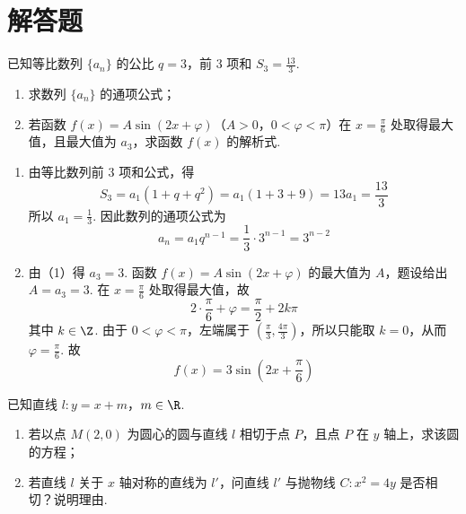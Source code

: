 \section{解答题}

\begin{problem}
已知等比数列 \(\{a_n\}\) 的公比 \(q=3\)，前 \(3\) 项和 \(S_3=\frac{13}{3}\).

\begin{enumerate}
\item 求数列 \(\{a_n\}\) 的通项公式；
\item 若函数 \(f(x)=A\sin\left(2x+\varphi\right)\)（\(A>0\)，\(0<\varphi<\pi\)）在 \(x=\frac{\pi}{6}\) 处取得最大值，且最大值为 \(a_3\)，求函数 \(f(x)\) 的解析式.
\end{enumerate}
\end{problem}

\begin{solution}
\begin{enumerate}
\item 由等比数列前 \(3\) 项和公式，得
\[
S_3=a_1\left(1+q+q^2\right)=a_1(1+3+9)=13a_1=\frac{13}{3}
\]
所以 \(a_1=\frac{1}{3}\). 因此数列的通项公式为
\[
a_n=a_1q^{n-1}=\frac{1}{3}\cdot3^{n-1}=3^{n-2}
\]

\item 由（1）得 \(a_3=3\). 函数 \(f(x)=A\sin(2x+\varphi)\) 的最大值为 \(A\)，题设给出 \(A=a_3=3\). 在 \(x=\frac{\pi}{6}\) 处取得最大值，故
\[
2\cdot\frac{\pi}{6}+\varphi=\frac{\pi}{2}+2k\pi
\]
其中 \(k\in\Z\). 由于 \(0<\varphi<\pi\)，左端属于 \(\left(\frac{\pi}{3},\frac{4\pi}{3}\right)\)，所以只能取 \(k=0\)，从而 \(\varphi=\frac{\pi}{6}\). 故
\[
f(x)=3\sin\left(2x+\frac{\pi}{6}\right)
\]
\end{enumerate}
\end{solution}

\begin{problem}
已知直线 \(l:y=x+m\)，\(m\in\R\).

\begin{enumerate}
\item 若以点 \(M(2,0)\) 为圆心的圆与直线 \(l\) 相切于点 \(P\)，且点 \(P\) 在 \(y\) 轴上，求该圆的方程；
\item 若直线 \(l\) 关于 \(x\) 轴对称的直线为 \(l'\)，问直线 \(l'\) 与抛物线 \(C:x^2=4y\) 是否相切？说明理由.
\end{enumerate}
\end{problem}

